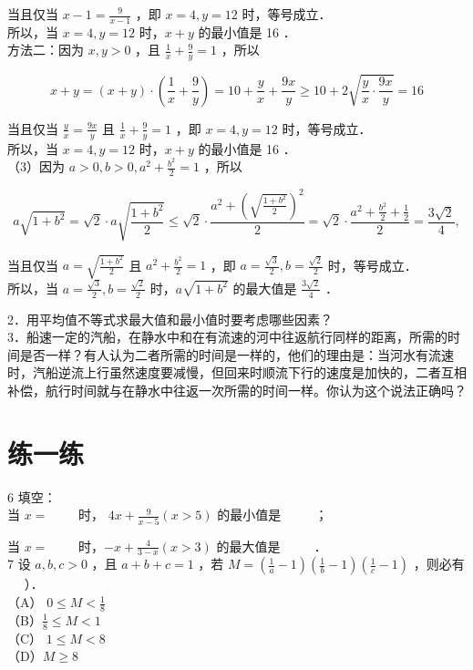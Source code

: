 \documentclass[10pt]{article}
\begin{document}
当且仅当 \(x-1=\frac{9}{x-1}\) ，即 \(x=4, y=12\) 时，等号成立．\\
所以，当 \(x=4, y=12\) 时，\(x+y\) 的最小值是 16 ．\\
方法二：因为 \(x, y>0\) ，且 \(\frac{1}{x}+\frac{9}{y}=1\) ，所以

\[
x+y=(x+y) \cdot\left(\frac{1}{x}+\frac{9}{y}\right)=10+\frac{y}{x}+\frac{9 x}{y} \geqslant 10+2 \sqrt{\frac{y}{x} \cdot \frac{9 x}{y}}=16
\]

当且仅当 \(\frac{y}{x}=\frac{9 x}{y}\) 且 \(\frac{1}{x}+\frac{9}{y}=1\) ，即 \(x=4, y=12\) 时，等号成立．\\
所以，当 \(x=4, y=12\) 时，\(x+y\) 的最小值是 16 ．\\
（3）因为 \(a>0, b>0, a^{2}+\frac{b^{2}}{2}=1\) ，所以

\[
a \sqrt{1+b^{2}}=\sqrt{2} \cdot a \sqrt{\frac{1+b^{2}}{2}} \leqslant \sqrt{2} \cdot \frac{a^{2}+\left(\sqrt{\frac{1+b^{2}}{2}}\right)^{2}}{2}=\sqrt{2} \cdot \frac{a^{2}+\frac{b^{2}}{2}+\frac{1}{2}}{2}=\frac{3 \sqrt{2}}{4},
\]

当且仅当 \(a=\sqrt{\frac{1+b^{2}}{2}}\) 且 \(a^{2}+\frac{b^{2}}{2}=1\) ，即 \(a=\frac{\sqrt{3}}{2}, b=\frac{\sqrt{2}}{2}\) 时，等号成立．\\
所以，当 \(a=\frac{\sqrt{3}}{2}, b=\frac{\sqrt{2}}{2}\) 时，\(a \sqrt{1+b^{2}}\) 的最大值是 \(\frac{3 \sqrt{2}}{4}\) ．

2．用平均值不等式求最大值和最小值时要考虑哪些因素？\\
3．船速一定的汽船，在静水中和在有流速的河中往返航行同样的距离，所需的时间是否一样？有人认为二者所需的时间是一样的，他们的理由是：当河水有流速时，汽船逆流上行虽然速度要减慢，但回来时顺流下行的速度是加快的，二者互相补偿，航行时间就与在静水中往返一次所需的时间一样。你认为这个说法正确吗？

\section*{练一练}
6 填空：\\
当 \(x=\) \(\qquad\)时， \(4 x+\frac{9}{x-5}(x>5)\) 的最小值是 \(\qquad\) ；

当 \(x=\) \(\qquad\)时，\(-x+\frac{4}{3-x}(x>3)\) 的最大值是 \(\qquad\) ．\\
7 设 \(a, b, c>0\) ，且 \(a+b+c=1\) ，若 \(M=\left(\frac{1}{a}-1\right)\left(\frac{1}{b}-1\right)\left(\frac{1}{c}-1\right)\) ，则必有 \(\quad\) ）．\\
（A） \(0 \leqslant M<\frac{1}{8}\)\\
（B）\(\frac{1}{8} \leqslant M<1\)\\
（C） \(1 \leqslant M<8\)\\
（D）\(M \geqslant 8\)
\end{document}
